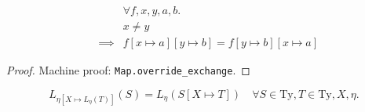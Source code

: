 \documentclass{llncs}
\newcommand*{\Ty}{\mathrm{Ty}}
\renewcommand*{\|}{\;|\;}
\newcommand*{\machproofc}[1]{Machine proof: \code{#1}.}
\newcommand*{\code}[1]{\texttt{#1}}
\begin{document}
\begin{lemma}
  \label{lemma:overriding_exchange}
  \begin{eqnarray*}
    &&         \forall f, x, y, a, b. \\
    &&         x \neq y \\
    &\implies& f[x \mapsto a][y \mapsto b] = f[y \mapsto b][x \mapsto a]
  \end{eqnarray*}

  \begin{proof}
    \machproofc{Map.override\_exchange}
  \end{proof}
\end{lemma}


\begin{lemma}
  \label{lemma:substitution_trace_language}
  \begin{equation*}
    L_{\eta[X \mapsto L_\eta(T)]}(S) = L_\eta(S[X \mapsto T])
      \quad \forall S \in \Ty, T \in \Ty, X, \eta.
  \end{equation*}
\end{lemma}
\end{document}
